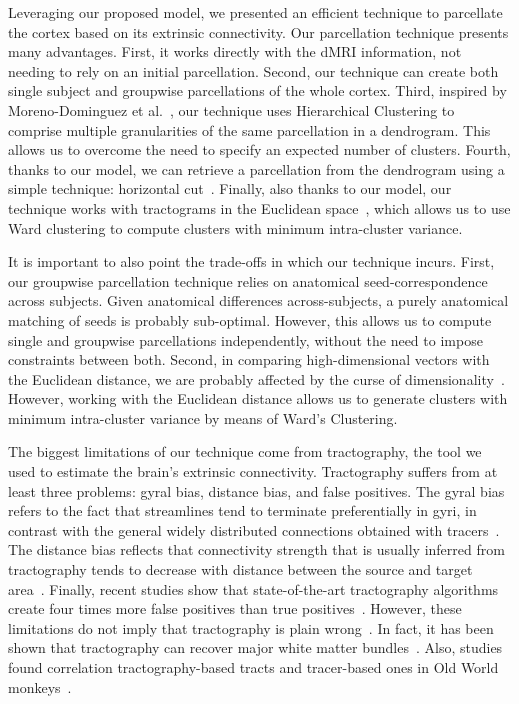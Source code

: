 Leveraging our proposed model, we presented an efficient technique to parcellate
the cortex based on its extrinsic connectivity. Our parcellation technique presents
many advantages. First, it works directly with the dMRI information, not needing
to rely on an initial parcellation. Second, our technique can create both
single subject and groupwise parcellations of the whole cortex. Third, inspired
by Moreno-Dominguez et al.~\cite{Moreno-Dominguez2014}, our technique uses Hierarchical
Clustering to comprise multiple granularities of the same parcellation in a
dendrogram. This allows us to overcome the need to specify an expected number
of clusters. Fourth, thanks to our model, we can retrieve a parcellation from
the dendrogram using a simple technique: horizontal cut~\cite{Murtagh2011}.
Finally, also thanks to our model, our technique works with tractograms
in the Euclidean space~\cite{Pohl2007}, which allows us to use Ward clustering
to compute clusters with minimum intra-cluster variance.

It is important to also point the trade-offs in which our technique incurs. First,
our groupwise parcellation technique relies on anatomical seed-correspondence across
subjects. Given anatomical differences across-subjects, a purely anatomical
matching of seeds is probably sub-optimal. However, this allows us to compute
single and groupwise parcellations independently, without the need to impose
constraints between both. Second, in comparing high-dimensional vectors with the
Euclidean distance, we are probably affected by the curse of dimensionality~\cite{Beyer1999}.
However, working with the Euclidean distance allows us to generate clusters with
minimum intra-cluster variance by means of  Ward's Clustering.

The biggest limitations of our technique come from tractography, the tool
we used to estimate the brain's extrinsic connectivity. Tractography suffers
from at least three problems: gyral bias, distance bias, and false positives.
The gyral bias refers to the fact that streamlines tend to terminate preferentially
in gyri, in contrast with the general widely distributed connections obtained with
tracers~\cite{VanEssen2014}. The distance bias reflects that connectivity strength
that is usually inferred from tractography tends to decrease with distance
between the source and target area~\cite{Jbabdi2013}. Finally, recent studies
show that state-of-the-art tractography algorithms create four times more false
positives than true positives~\cite{Hein2016}. However, these limitations do not
imply that tractography is plain wrong~\cite{Asimov1988}. In fact, it has been
shown that tractography can recover major white matter bundles~\cite{Catani2008}.
Also, studies found correlation tractography-based tracts and tracer-based
ones in Old World monkeys~\cite{Donahue2016}.

